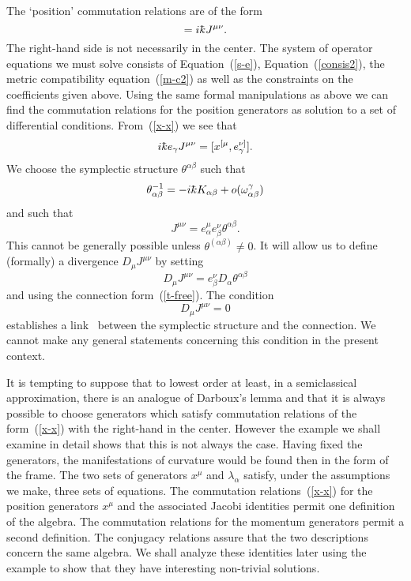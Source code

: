 \documentclass[12pt,a4paper]{article}
\newcounter{eg}
\def\kbar{{\mathchar'26\mkern-9muk}}
\begin{document}
The `position' commutation relations are of the form
\begin{equation}
[x^\mu, x^\nu] = i\kbar J^{\mu\nu}.                        \label{x-x}
\end{equation}
The right-hand side is not necessarily in the center.  The system of
operator equations we must solve consists of Equation~(\ref{s-e}),
Equation~(\ref{consis2}), the metric compatibility
equation~(\ref{m-c2}) as well as the constraints on the coefficients
given above.  Using the same formal manipulations as above we can find
the commutation relations for the position generators as solution to a
set of differential conditions. From~(\ref{x-x}) we see that
\begin{equation}
i\kbar e_\gamma J^{\mu\nu} = [x^{[\mu}, e^{\nu]}_\gamma]  \label{pxx}.
\end{equation}
We choose the symplectic structure $\theta^{\alpha\beta}$ such that
$$
\theta^{-1}_{\alpha\beta} = -i\kbar K_{\alpha\beta} + 
o(\omega^\gamma_{\alpha\beta})
$$ 
and such that 
\begin{equation}
J^{\mu\nu} = 
e^\mu_\alpha e^\nu_\beta \theta^{\alpha\beta}.            \label{J-theta}
\end{equation}
This cannot be generally possible unless
$\theta^{(\alpha\beta)}\neq 0$.  It will allow us to define
(formally) a divergence $D_\mu J^{\mu\nu}$ by setting
\begin{equation}
D_\mu J^{\mu\nu} = 
e^\nu_\beta D_\alpha \theta^{\alpha\beta}           \label{div}
\end{equation}
and using the connection form~(\ref{t-free}).
The condition 
$$
D_\mu J^{\mu\nu} =0 
$$
establishes a link~\cite{BouCah99} between the symplectic structure
and the connection. We cannot make any general statements concerning
this condition in the present context.

It is tempting to suppose that to lowest order at least, in a
semiclassical approximation, there is an analogue of Darboux's lemma
and that it is always possible to choose generators which satisfy
commutation relations of the form~(\ref{x-x}) with the right-hand in
the center.  However the example we shall examine in detail shows that
this is not always the case. Having fixed the generators, the
manifestations of curvature would be found then in the form of the
frame. The two sets of generators $x^\mu$ and $\lambda_\alpha$
satisfy, under the assumptions we make, three sets of equations.  The
commutation relations~(\ref{x-x}) for the position generators $x^\mu$
and the associated Jacobi identities permit one definition of the
algebra. The commutation relations for the momentum generators permit
a second definition. The conjugacy relations assure that the two
descriptions concern the same algebra.  We shall analyze these
identities later using the example to show that they have interesting
non-trivial solutions.
\end{document}
